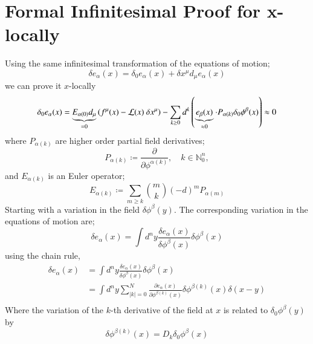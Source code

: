 \documentclass{article}
\begin{document}
\section{Formal Infinitesimal Proof for x-locally}
Using the same infinitesimal transformation of the equations of motion;
\[
	\delta e_\alpha(x) = \delta_0 e_\alpha(x) + \delta x^\mu d_\mu e_\alpha(x)
\]
we can prove it $x$-locally
\[
\delta_0 e_{\alpha}(x) = \underbrace{E_{\alpha(0)} d_{\mu}}_{=0}\left(f^{\mu}(x)-{\cal L}(x)~\delta x^{\mu}\right) - \sum_{k\geq 0} d^k\left( \underbrace{e_{\beta}(x)}_{\approx 0} \cdot P_{\alpha(k)}\delta_0\phi^{\beta}(x) \right) \approx 0
\]
where $P_{\alpha(k)}$ are higher order partial field derivatives;
\[
P_{\alpha(k)} \coloneqq \frac{\partial}{\partial \phi^{\alpha(k)}}, \quad k \in \mathbb{N}_0^n,
\]
and $E_{\alpha(k)}$ is an Euler operator;
\[
	E_{\alpha(k)} \coloneqq \sum_{m \ge k}\binom{m}{k} (-d)^m P_{\alpha(m)}
\]
Starting with a variation in the field $\delta \phi^\beta(y)$. The corresponding variation in the equations of motion are;
\[
	\delta e_\alpha(x) = \int d^ny \frac{\delta e_\alpha(x)}{\delta \phi^\beta(x)}\delta \phi^\beta(x)
\]
using the chain rule,
\begin{align*}
	\delta e_\alpha(x) &= \int d^ny \frac{\delta e_\alpha(x)}{\delta \phi^\beta(x)}\delta \phi^\beta(x) \\
			   &= \int d^ny \sum_{|k|=0}^N \frac{\partial e_{\alpha}(x)}{\partial \phi^{\beta(k)}(x)} \delta \phi^{\beta(k)}(x)\delta(x-y) \\
\end{align*}
Where the variation of the $k$-th derivative of the field at $x$ is related to $\delta_0 \phi^\beta(y)$ by
\[
	\delta \phi^{\beta(k)}(x)=D_{k}\delta_0 \phi^\beta(x)
\]
\end{document}
